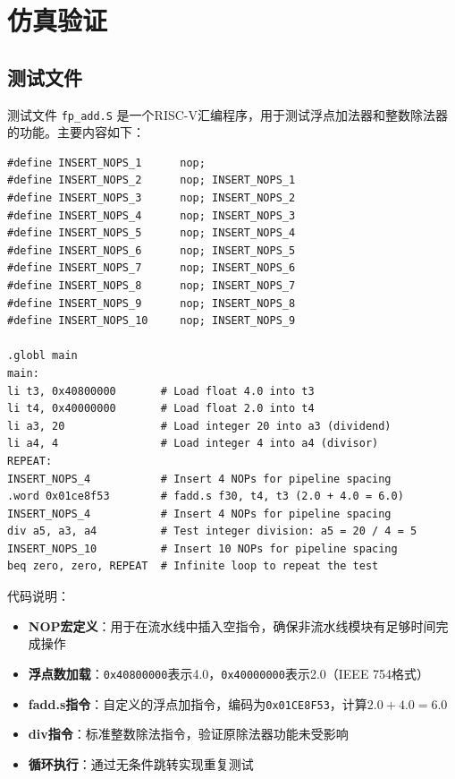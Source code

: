 \documentclass[12pt,a4paper]{article}
\begin{document}
\clearpage
\section{仿真验证}

\subsection{测试文件}

测试文件 \texttt{fp\_add.S} 是一个RISC-V汇编程序，用于测试浮点加法器和整数除法器的功能。主要内容如下：

\begin{lstlisting}[language={[x86masm]Assembler}]
#define INSERT_NOPS_1      nop;
#define INSERT_NOPS_2      nop; INSERT_NOPS_1
#define INSERT_NOPS_3      nop; INSERT_NOPS_2
#define INSERT_NOPS_4      nop; INSERT_NOPS_3
#define INSERT_NOPS_5      nop; INSERT_NOPS_4
#define INSERT_NOPS_6      nop; INSERT_NOPS_5
#define INSERT_NOPS_7      nop; INSERT_NOPS_6
#define INSERT_NOPS_8      nop; INSERT_NOPS_7
#define INSERT_NOPS_9      nop; INSERT_NOPS_8
#define INSERT_NOPS_10     nop; INSERT_NOPS_9

.globl main 
main:
li t3, 0x40800000       # Load float 4.0 into t3
li t4, 0x40000000       # Load float 2.0 into t4
li a3, 20               # Load integer 20 into a3 (dividend)
li a4, 4                # Load integer 4 into a4 (divisor)
REPEAT: 
INSERT_NOPS_4           # Insert 4 NOPs for pipeline spacing
.word 0x01ce8f53        # fadd.s f30, t4, t3 (2.0 + 4.0 = 6.0)
INSERT_NOPS_4           # Insert 4 NOPs for pipeline spacing
div a5, a3, a4          # Test integer division: a5 = 20 / 4 = 5
INSERT_NOPS_10          # Insert 10 NOPs for pipeline spacing
beq zero, zero, REPEAT  # Infinite loop to repeat the test
\end{lstlisting}

代码说明：
\begin{itemize}[itemsep=0pt, parsep=3pt]
    \item \textbf{NOP宏定义}：用于在流水线中插入空指令，确保非流水线模块有足够时间完成操作
    \item \textbf{浮点数加载}：\texttt{0x40800000}表示4.0，\texttt{0x40000000}表示2.0（IEEE 754格式）
    \item \textbf{fadd.s指令}：自定义的浮点加指令，编码为\texttt{0x01CE8F53}，计算$2.0 + 4.0 = 6.0$
    \item \textbf{div指令}：标准整数除法指令，验证原除法器功能未受影响
    \item \textbf{循环执行}：通过无条件跳转实现重复测试
\end{itemize}
\end{document}
